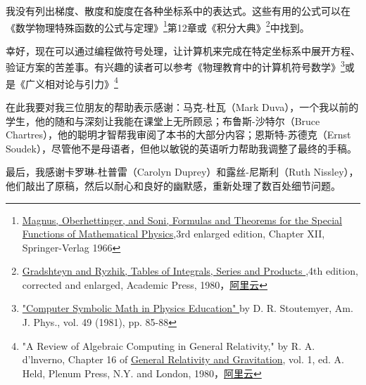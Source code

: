 我没有列出梯度、散度和旋度在各种坐标系中的表达式。这些有用的公式可以在《数学物理特殊函数的公式与定理》\footnote{\href{https://sci-hub.wf/10.1007/978-3-662-11761-3}{Magnus, Oberhettinger, and Soni, Formulas and Theorems for the Special Functions of Mathematical Physics},3rd enlarged edition, Chapter XII, Springer-Verlag 1966}第12章或《积分大典》\footnote{\href{https://www.sciencedirect.com/book/9780122947575/table-of-integrals-series-and-products}{Gradshteyn and Ryzhik, Tables of Integrals, Series and Products },4th edition, corrected and enlarged, Academic Press, 1980，\href{https://www.aliyundrive.com/s/sAoaurDpzUX}{阿里云}}中找到。

幸好，现在可以通过编程做符号处理，让计算机来完成在特定坐标系中展开方程、验证方案的苦差事。有兴趣的读者可以参考《物理教育中的计算机符号数学》\footnote{\href{https://sci-hub.hkvisa.net/10.1119/1.12634}{"Computer Symbolic Math in Physics Education" }by D. R. Stoutemyer, Am. J. Phys., vol. 49 (1981), pp. 85-88}或是《广义相对论与引力》\footnote{"A Review of Algebraic Computing in General Relativity," by R. A. d'lnverno, Chapter 16 of \href{https://www.scribd.com/document/447349955}{General Relativity and Gravitation}, vol. 1, ed. A. Held, Plenum Press, N.Y. and London, 1980，\href{https://www.aliyundrive.com/s/zuUnV57sbvT}{阿里云}}

在此我要对我三位朋友的帮助表示感谢：马克-杜瓦（Mark Duva），一个我以前的学生，他的随和与深刻让我能在课堂上无所顾忌；布鲁斯-沙特尔（Bruce Chartres），他的聪明才智帮我审阅了本书的大部分内容；恩斯特-苏德克（Ernst Soudek），尽管他不是母语者，但他以敏锐的英语听力帮助我调整了最终的手稿。

最后，我感谢卡罗琳-杜普雷（Carolyn Duprey）和露丝-尼斯利（Ruth Nissley），他们敲出了原稿，然后以耐心和良好的幽默感，重新处理了数百处细节问题。

{\rightline{${}$}}

